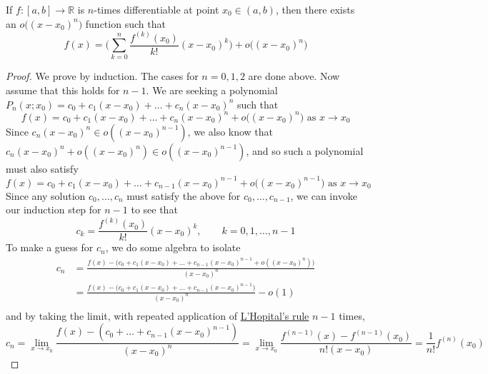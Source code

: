   \begin{theorem}
    \label{thm:taylor-peano}
    If $f: [a, b] \to \mathbb{R}$ is $n$-times differentiable at point $x_0 \in (a, b)$, then there exists an $o \big( (x - x_0)^n \big)$  function such that 
    \begin{equation}
      f(x) = \bigg( \sum_{k=0}^n \frac{f^{(k)}(x_0)}{k!} (x - x_0)^k  \bigg) + o \big( (x - x_0)^n \big)
    \end{equation} 
  \end{theorem}
  \begin{proof}
    We prove by induction. The cases for $n = 0, 1, 2$ are done above. Now assume that this holds for $n-1$. We are seeking a polynomial $P_n(x; x_0) = c_0 + c_1 (x - x_0) + \ldots + c_n (x - x_0)^n$ such that
    \begin{equation}
      f(x) = c_0 + c_1 (x - x_0) + \ldots + c_n (x - x_0)^n + o\big((x - x_0)^n\big) \text{ as } x \rightarrow x_0
    \end{equation}
    Since $c_n (x - x_0)^n \in o((x - x_0)^{n-1})$, we also know that $c_n (x - x_0)^n + o ((x - x_0)^n ) \in o((x - x_0)^{n-1})$, and so such a polynomial must also satisfy 
    \begin{equation}
      f(x) = c_0 + c_1 (x - x_0) + \ldots + c_{n-1} (x - x_0)^{n-1} + o\big((x - x_0)^{n-1}\big) \text{ as } x \rightarrow x_0
    \end{equation}
    Since any solution $c_0, \ldots, c_n$ must satisfy the above for $c_0, \ldots, c_{n-1}$, we can invoke our induction step for $n-1$ to see that 
    \begin{equation}
      c_k = \frac{f^{(k)} (x_0)}{k!} (x - x_0)^k, \qquad k = 0, 1, \ldots, n-1
    \end{equation}
    To make a guess for $c_n$, we do some algebra to isolate 
    \begin{align}
      c_n & = \frac{f(x) - \big(c_0 + c_1 (x - x_0) + \ldots + c_{n-1} (x - x_0)^{n-1} + o ((x - x_0)^{n}) \big)}{(x - x_0)^n} \\  
          & = \frac{f(x) - \big(c_0 + c_1 (x - x_0) + \ldots + c_{n-1} (x - x_0)^{n-1} \big)}{(x - x_0)^{n}} - o(1) \\  
    \end{align}
    and by taking the limit, with repeated application of \hyperref[thm:lhopital]{L'Hopital's rule} $n-1$ times, 
    \begin{equation}
      c_n = \lim_{x \rightarrow x_0} \frac{f(x) - (c_0 + \ldots + c_{n-1}(x - x_0)^{n-1})}{(x - x_0)^n} = \lim_{x \to x_0} \frac{f^{(n-1)} (x) - f^{(n-1)} (x_0)}{n! (x - x_0)} = \frac{1}{n!} f^{(n)} (x_0)

\end{equation}
\end{proof}
